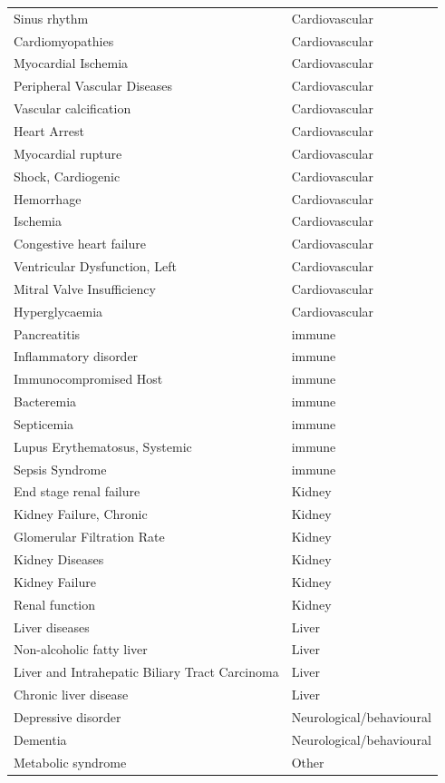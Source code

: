 \documentclass[11pt,twoside]{bristolthesis}
\begin{document}
\begin{longtable}[t]{ll}
Sinus rhythm & Cardiovascular\\
\addlinespace
Cardiomyopathies & Cardiovascular\\
Myocardial Ischemia & Cardiovascular\\
Peripheral Vascular Diseases & Cardiovascular\\
Vascular calcification & Cardiovascular\\
Heart Arrest & Cardiovascular\\
\addlinespace
Myocardial rupture & Cardiovascular\\
Shock, Cardiogenic & Cardiovascular\\
Hemorrhage & Cardiovascular\\
Ischemia & Cardiovascular\\
Congestive heart failure & Cardiovascular\\
\addlinespace
Ventricular Dysfunction, Left & Cardiovascular\\
Mitral Valve Insufficiency & Cardiovascular\\
Hyperglycaemia & Cardiovascular\\
Pancreatitis & immune\\
Inflammatory disorder & immune\\
\addlinespace
Immunocompromised Host & immune\\
Bacteremia & immune\\
Septicemia & immune\\
Lupus Erythematosus, Systemic & immune\\
Sepsis Syndrome & immune\\
\addlinespace
End stage renal failure & Kidney\\
Kidney Failure, Chronic & Kidney\\
Glomerular Filtration Rate & Kidney\\
Kidney Diseases & Kidney\\
Kidney Failure & Kidney\\
\addlinespace
Renal function & Kidney\\
Liver diseases & Liver\\
Non-alcoholic fatty liver & Liver\\
Liver and Intrahepatic Biliary Tract Carcinoma & Liver\\
Chronic liver disease & Liver\\
\addlinespace
Depressive disorder & Neurological/behavioural\\
Dementia & Neurological/behavioural\\
Metabolic syndrome & Other\\

\end{longtable}
\end{document}
